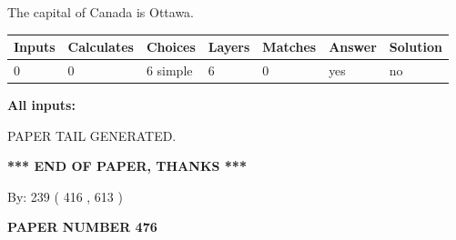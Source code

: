 \documentclass[12pt]{article}
\begin{document}
 
The capital of Canada is Ottawa.
 
 
\noindent{}
 
 
   
   
   
   
\noindent\begin{tabular}{|l|l|l|l|l|l|l|}
 \hline
Inputs & Calculates & Choices & Layers & Matches & Answer & Solution \\ \hline
 0  & 
 0  & 
 6
  simple  
  & 
 6  & 
 0  & 
  yes & 
  no 
  \\ \hline
 \end{tabular}
   
   
   
   
\noindent{}
   
   
   
   
\noindent\vspace{0.1in}\hspace{-0.08in} {\textbf{\Large{All inputs: }}}
   
   
   
   
   
   
 \vspace{0.2in}
 
   
   
\vspace{2.0in} PAPER TAIL GENERATED.
   
   
   
   
\vspace{1.0in} 
{\textbf{\large{ *** END OF PAPER, THANKS *** }}} 
   
   
\hspace{1.0in} By: 
 239 ( 416 ,  613 )
   
   
   
   
\newpage 
\setcounter{page}{ 
   476001 } 
   
   
   
   
 {\textbf{ \Large{ PAPER NUMBER  476  }}}
   
   
\vspace{0.2in}
   
   
   
   
   
   
   
\end{document}
